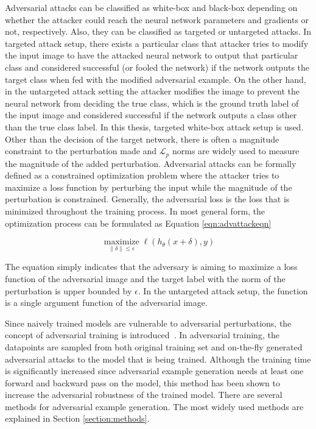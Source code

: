 Adversarial attacks can be classified as white-box and black-box depending on whether the attacker could reach the neural network parameters and gradients or not, respectively. Also, they can be classified as targeted or untargeted attacks. In targeted attack setup, there exists a particular class that attacker tries to modify the input image to have the attacked neural network to output that particular class and considered successful (or fooled the network) if the network outputs the target class when fed with the modified adversarial example. On the other hand, in the untargeted attack setting the attacker modifies the image to prevent the neural network from deciding the true class, which is the ground truth label of the input image and considered successful if the network outputs a class other than the true class label. In this thesis, targeted white-box attack setup is used. Other than the decision of the target network, there is often a magnitude constraint to the perturbation made and \(\mathcal{L}_p\) norms are widely used to measure the magnitude of the added perturbation. Adversarial attacks can be formally defined as a constrained optimization problem where the attacker tries to maximize a loss function by perturbing the input while the magnitude of the perturbation is constrained. Generally, the adversarial loss is the loss that is minimized throughout the training process. In most general form, the optimization process can be formulated as Equation \ref{eqn:advattackeqn}

\begin{equation}
    \label{eqn:advattackeqn}
    \underset{\|\delta\| \leq \epsilon}{\operatorname{maximize}} \ell\left(h_{\theta}(x+\delta), y\right)
\end{equation}

The equation simply indicates that the adversary is aiming to maximize a loss function of the adversarial image and the target label with the norm of the perturbation is upper bounded by \(\epsilon\). In the untargeted attack setup, the function is a single argument function of the adversarial image.

Since naively trained models are vulnerable to adversarial perturbations, the concept of adversarial training is introduced~\cite{madry2017towards}. In adversarial training, the datapoints are sampled from both original training set and on-the-fly generated adversarial attacks to the model that is being trained. Although the training time is significantly increased since adversarial example generation needs at least one forward and backward pass on the model, this method has been shown to increase the adversarial robustness of the trained model. There are several methods for adversarial example generation. The most widely used methods are explained in Section \ref{section:methods}.

